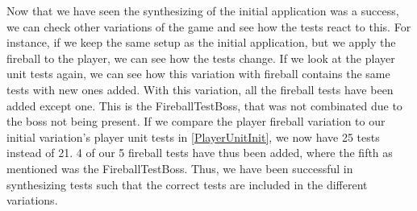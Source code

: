 Now that we have seen the synthesizing of the initial application was a success, we can check other variations of the game and see how the tests react to this. For instance, if we keep the same setup as the initial application, but we apply the fireball to the player, we can see how the tests change. If we look at the player unit tests again, we can see how this variation with fireball contains the same tests with new ones added. With this variation, all the fireball tests have been added except one. This is the FireballTestBoss, that was not combinated due to the boss not being present. If we compare the player fireball variation to our initial variation's player unit tests in \autoref{PlayerUnitInit}, we now have 25 tests instead of 21. 4 of our 5 fireball tests have thus been added, where the fifth as mentioned was the FireballTestBoss. Thus, we have been successful in synthesizing tests such that the correct tests are included in the different variations. %
